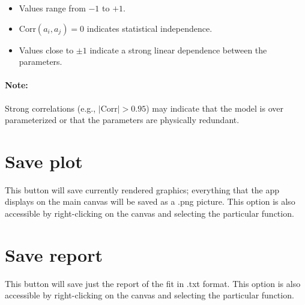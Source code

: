 \begin{itemize}
    \item Values range from $-1$ to $+1$.
    \item $\mathrm{Corr}(a_i, a_j) = 0$ indicates statistical independence.
    \item Values close to $\pm1$ indicate a strong linear dependence between the parameters.
\end{itemize}

\paragraph{Note:} Strong correlations (e.g., $|\mathrm{Corr}| > 0.95$) may indicate that the model is over parameterized or that the parameters are physically redundant.

\section{Save plot}
This button will save currently rendered graphics; everything that the app displays on the main canvas will be saved as a .png picture. This option is also accessible by right-clicking on the canvas and selecting the particular function.
\section{Save report}
This button will save just the report of the fit in .txt format. This option is also accessible by right-clicking on the canvas and selecting the particular function.